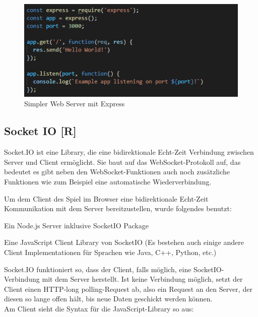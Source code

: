 \begin{figure}[H]
  \centering
  \includegraphics[scale=1]{pics/Express.PNG}
  \caption{Simpler Web Server mit Express}
\end{figure}

\subsection{Socket IO [R]}

Socket.IO ist eine Library, die eine bidirektionale Echt-Zeit Verbindung zwischen Server und Client ermöglicht. Sie baut auf das WebSocket-Protokoll auf, das bedeutet es gibt neben den WebSocket-Funktionen auch noch zusätzliche Funktionen wie zum Beispiel eine automatische Wiederverbindung.

Um dem Client des Spiel im Browser eine bidirektionale Echt-Zeit Kommunikation mit dem Server bereitzustellen, wurde folgendes benutzt:
\begin{compactitem}
  \item Ein Node.js Server inklusive SocketIO Package
  \item Eine JavaScript Client Library von SocketIO (Es bestehen auch einige andere Client Implementationen für Sprachen wie Java, C++, Python, etc.)
\end{compactitem}

Socket.IO funktioniert so, dass der Client, falls möglich, eine SocketIO-Verbindung mit dem Server herstellt.
Ist keine Verbindung möglich, setzt der Client einen HTTP-long polling-Request ab, also ein Request an den Server, der diesen so lange offen hält, bis neue Daten geschickt werden können. \cite{httpLongPolling} \\
Am Client sieht die Syntax für die JavaScript-Library so aus:

